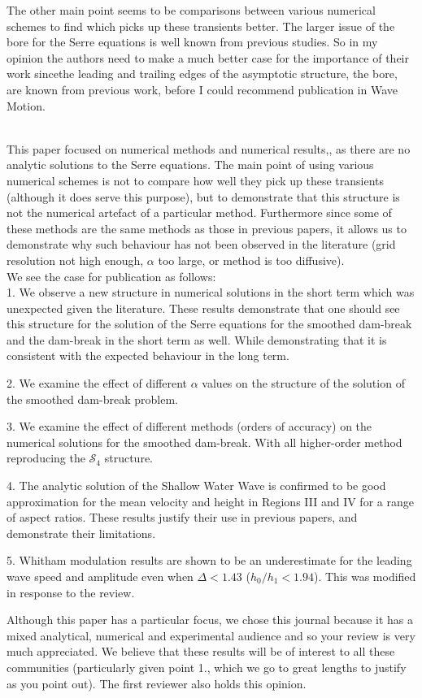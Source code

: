 \documentclass[times]{article}
\begin{document}
	The other main point seems to be comparisons between various numerical schemes to find which picks up these transients better. The larger issue of the bore for the Serre equations is well known from previous studies. So in my opinion the authors need to make a much better case for the importance of their work sincethe leading and trailing edges of the asymptotic structure, the bore, are known from previous work, before I could recommend publication in Wave Motion. 
	\\ \\
	{\color{blue} 
		This paper focused on numerical methods and numerical results,, as there are no analytic solutions to the Serre equations. The main point of using various numerical schemes is not to compare how well they pick up these transients (although it does serve this purpose), but to demonstrate that this structure is not the numerical artefact of a particular method. Furthermore since some of these methods are the same methods as those in previous papers, it allows us to demonstrate why such behaviour has not been observed in the literature (grid resolution not high enough, $\alpha$ too large, or method is too diffusive). \\
		
		We see the case for publication as follows:\\
		
		1. We observe a new structure in numerical solutions in the short term which was unexpected given the literature. These results demonstrate that one should see this structure for the solution of the Serre equations for the smoothed dam-break and the dam-break in the short term as well. While demonstrating that it is consistent with the expected behaviour in the long term. 
		
		2. We examine the effect of different $\alpha$ values on the structure of the solution of the smoothed dam-break problem.
		
		3. We examine the effect of different methods (orders of accuracy) on the numerical solutions for the smoothed dam-break. With all higher-order method reproducing the $\mathcal{S}_4$ structure.
		
		4. The analytic solution of the Shallow Water Wave is confirmed to be good approximation for the mean velocity and height in Regions III and IV for a range of aspect ratios. These results justify their use in previous papers, and demonstrate their limitations.
		
		5. Whitham modulation results are shown to be an underestimate for the leading wave speed and amplitude even when $\Delta < 1.43$ ($h_0/h_1 < 1.94$). This was modified in response to the review.
		
		Although this paper has a particular focus, we chose this journal because it has a mixed analytical, numerical and experimental audience and so your review is very much appreciated. We believe that these results will be of interest to all these communities (particularly given point 1., which we go to great lengths to justify as you point out). The first reviewer also holds this opinion.
			}
			 \\ \\
	
\end{document}
